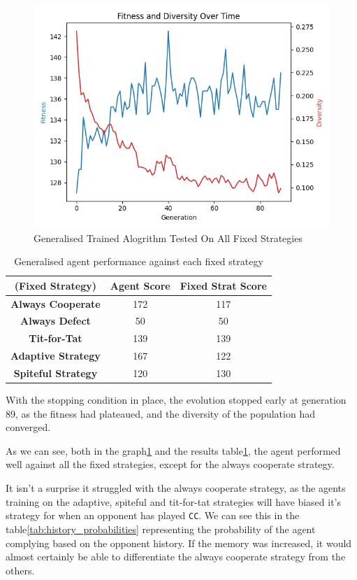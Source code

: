 \documentclass[11pt]{scrartcl} %
\begin{document}
\begin{figure}[H]
	\centering
	\includegraphics[width=0.8\linewidth]{Figures/part_1/generalised.png}
	\caption{Generalised Trained Alogrithm Tested On All Fixed Strategies}
	\label{fig:general_graph}
\end{figure}

\begin{table}[h!]
    \centering
    \begin{tabular}{|c|c|c|}
        \hline
		\textbf{(Fixed Strategy)} & \textbf{Agent Score} & \textbf{Fixed Strat Score} \\ \hline
        \textbf{Always Cooperate} & 172 & 117\\ \hline
        \textbf{Always Defect} & 50 & 50 \\ \hline
        \textbf{Tit-for-Tat} & 139 & 139 \\ \hline
        \textbf{Adaptive Strategy} & 167 & 122 \\ \hline
        \textbf{Spiteful Strategy} & 120 & 130 \\ \hline
    \end{tabular}
    \caption{Generalised agent performance against each fixed strategy}
    \label{tab:gen_agent_vs_fixed_strats}
\end{table}

With the stopping condition in place, the evolution stopped early at generation 89, as the fitness had plateaued, and the diversity of the population had converged.

As we can see, both in the graph\ref{fig:general_graph} and the results table\ref{tab:gen_agent_vs_fixed_strats}, 
the agent performed well against all the fixed strategies, except for the always cooperate strategy.

It isn't a surprise it struggled with the always cooperate strategy, as the agents training on the adaptive, spiteful and tit-for-tat strategies will have biased it's strategy for when an opponent has played \texttt{CC}. 
We can see this in the table\ref{tab:history_probabilities} representing the probability of the agent complying based on the opponent history.
If the memory was increased, it would almost certainly be able to differentiate the always cooperate strategy from the others.
\end{document}
